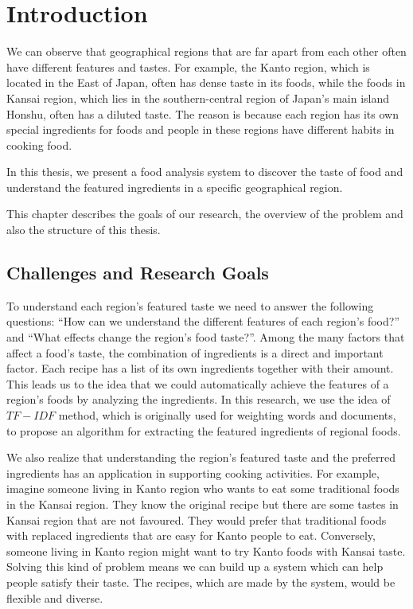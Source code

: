 \chapter{Introduction}\label{chap:intro}

We can observe that geographical regions that are far apart from each other often have different features and tastes. For example, the Kanto region, which is located in the East of Japan, often has dense taste in its foods, while the foods in Kansai region, which lies in the southern-central region of Japan's main island Honshu, often has a diluted taste. The reason is because each region has its own special ingredients for foods and people in these regions have different habits in cooking food.

In this thesis, we present a food analysis system to discover the taste of food and understand the featured ingredients in a specific geographical region.

This chapter describes the goals of our research, the overview of the problem and also the structure of this thesis.

\clearpage


\section{Challenges and Research Goals}\label{sec:challenge}

\par To understand each region's featured taste we need to answer the following questions: ``How can we understand the different features of each region's food?'' and ``What effects change the region's food taste?''. Among the many factors that affect a food's taste, the combination of ingredients is a direct and important factor. Each recipe has a list of its own ingredients together with their amount. This leads us to the idea that we could automatically achieve the features of a region's foods by analyzing the ingredients. In this research, we use the idea of $TF-IDF$ method, which is originally used for weighting words and documents, to propose an algorithm for extracting the featured ingredients of regional foods.  

\par We also realize that understanding the region's featured taste and the preferred ingredients has an application in supporting cooking activities. For example, imagine someone living in Kanto region who wants to eat some traditional foods in the Kansai region. They know the original recipe but there are some tastes in Kansai region that are not favoured. They would prefer that traditional foods with replaced ingredients that are easy for Kanto people to eat. Conversely, someone living in Kanto region might want to try Kanto foods with Kansai taste. Solving this kind of problem means we can build up a system which can help people satisfy their taste. The recipes, which are made by the system, would be flexible and diverse.

